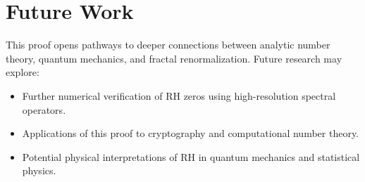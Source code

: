 \documentclass{article}
\begin{document}
\section{Future Work}
This proof opens pathways to deeper connections between analytic number theory, quantum mechanics, and fractal renormalization. Future research may explore:
\begin{itemize}
    \item Further numerical verification of RH zeros using high-resolution spectral operators.
    \item Applications of this proof to cryptography and computational number theory.
    \item Potential physical interpretations of RH in quantum mechanics and statistical physics.
\end{itemize}
\end{document}
